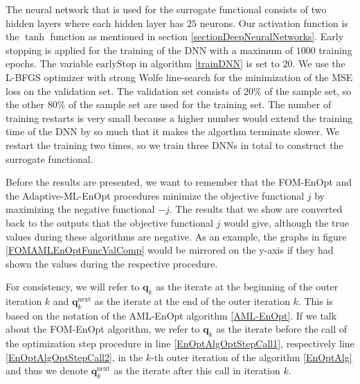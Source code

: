 The neural network that is used for the surrogate functional consists of two hidden layers where each hidden layer has $25$ neurons. Our activation function is the $\tanh$ function as mentioned in section \ref{sectionDeepNeuralNetworks}. Early stopping is applied for the training of the DNN with a maximum of $1000$ training epochs. The variable $\mathrm{earlyStop}$ in algorithm \ref{trainDNN} is set to $20$. We use the L-BFGS optimizer with strong Wolfe line-search for the minimization of the MSE loss on the validation set. The validation set consists of $20\%$ of the sample set, so the other $80\%$ of the sample set are used for the training set. The number of training restarts is very small because a higher number would extend the training time of the DNN by so much that it makes the algorthm terminate slower. We restart the training two times, so we train three DNNs in total to construct the surrogate functional.

Before the results are presented, we want to remember that the FOM-EnOpt and the Adaptive-ML-EnOpt procedures minimize the objective functional $j$ by maximizing the negative functional $-j$. The results that we show are converted back to the outputs that the objective functional $j$ would give, although the true values during these algorithms are negative. As an example, the graphs in figure \ref{FOMAMLEnOptFuncValComp} would be mirrored on the y-axis if they had shown the values during the respective procedure.

For consistency, we will refer to $\mathbf{q}_k$ as the iterate at the beginning of the outer iteration $k$ and $\mathbf{q}^\mathrm{next}_k$ as the iterate at the end of the outer iteration $k$. This is based on the notation of the AML-EnOpt algorithm \ref{AML-EnOpt}. If we talk about the FOM-EnOpt algorithm, we refer to $\mathbf{q}_k$ as the iterate before the call of the optimization step procedure in line \ref{EnOptAlgOptStepCall1}, respectively line \ref{EnOptAlgOptStepCall2}, in the $k$-th outer iteration of the algorithm \ref{EnOptAlg} and thus we denote $\mathbf{q}^\mathrm{next}_k$ as the iterate after this call in iteration $k$.

